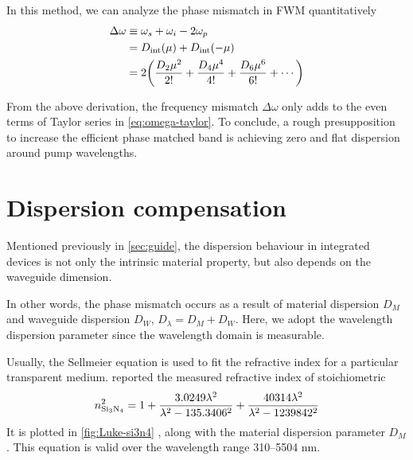 In this method, we can analyze the phase mismatch in FWM quantitatively
\begin{align}\label{eq:freq-mismatch}
	\Delta \omega &\equiv \omega_s + \omega_i - 2 \omega_p \\
	&= D_\mathrm{int}(\mu) + D_\mathrm{int}(-\mu) \nonumber \\
	&= 2\qty(\frac{D_2 \mu^2}{2!} + \frac{D_4 \mu^4}{4!} + \frac{D_6 \mu^6}{6!} +\cdots)  \nonumber
\end{align}

From the above derivation, the frequency mismatch $ \Delta\omega $ only adds to the even terms of Taylor series in \autoref{eq:omega-taylor}.
To conclude, a rough presupposition to increase the efficient phase matched band is achieving zero and flat dispersion around pump wavelengths.

\section{Dispersion compensation}
Mentioned previously in \autoref{sec:guide}, the dispersion behaviour in integrated devices is not only the intrinsic material property, but also depends on the waveguide dimension. 

In other words, the phase mismatch occurs as a result of material dispersion $D_M$ and waveguide dispersion $ D_W $, $D_{\lambda}= D_M + D_W$. Here, we adopt the wavelength dispersion parameter since the wavelength domain is measurable.

Usually, the Sellmeier equation is used to fit the refractive index for a particular transparent medium. \citeauthor{Luke2015a} reported the measured refractive index of stoichiometric  \cite{Luke2015a}
\begin{equation}\label{eq:si3n4-selleimeier}
    n_{\ce{Si3N4}}^2 = 1 + \frac{3.0249 \lambda^2}{\lambda^2-135.3406^2} + \frac{40314 \lambda^2}{\lambda^2 - 1239842^2}
\end{equation}
It is plotted in \autoref{fig:Luke-si3n4} , along with the material dispersion parameter $D_M$. This equation is valid over the wavelength range 310–5504 nm.

\begin{figure}
    \centering
    
    \label{fig:Luke-si3n4}
\end{figure}

